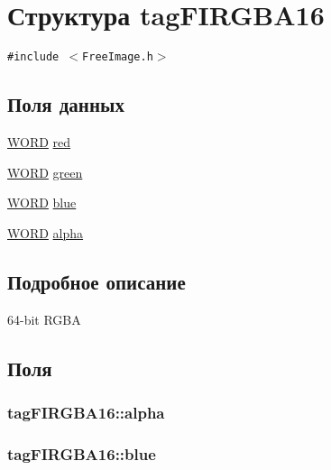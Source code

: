 \hypertarget{structtag_f_i_r_g_b_a16}{
\section{Структура tagFIRGBA16}
\label{structtag_f_i_r_g_b_a16}
}
{\tt \#include $<$FreeImage.h$>$}

\subsection*{Поля данных}
\begin{CompactItemize}
\item 
\hyperlink{filtration__run_2free_image_2_free_image_8h_b24077addd3b7b13e086987ff296552c}{WORD} \hyperlink{structtag_f_i_r_g_b_a16_580143c8b2f5e28721972342a6facd01}{red}
\item 
\hyperlink{filtration__run_2free_image_2_free_image_8h_b24077addd3b7b13e086987ff296552c}{WORD} \hyperlink{structtag_f_i_r_g_b_a16_0ae72ef6b7fe786b9ea6068579cd3f2d}{green}
\item 
\hyperlink{filtration__run_2free_image_2_free_image_8h_b24077addd3b7b13e086987ff296552c}{WORD} \hyperlink{structtag_f_i_r_g_b_a16_fe4aa863b00988ad24831a1432ef837e}{blue}
\item 
\hyperlink{filtration__run_2free_image_2_free_image_8h_b24077addd3b7b13e086987ff296552c}{WORD} \hyperlink{structtag_f_i_r_g_b_a16_9875250254b19efbfb321bf33ae2fdf6}{alpha}
\end{CompactItemize}


\subsection{Подробное описание}
64-bit RGBA 

\subsection{Поля}
\hypertarget{structtag_f_i_r_g_b_a16_9875250254b19efbfb321bf33ae2fdf6}{
\subsubsection[{alpha}]{ {\bf tagFIRGBA16::alpha}}}
\label{structtag_f_i_r_g_b_a16_9875250254b19efbfb321bf33ae2fdf6}


\hypertarget{structtag_f_i_r_g_b_a16_fe4aa863b00988ad24831a1432ef837e}{
\subsubsection[{blue}]{ {\bf tagFIRGBA16::blue}}}
\label{structtag_f_i_r_g_b_a16_fe4aa863b00988ad24831a1432ef837e}


